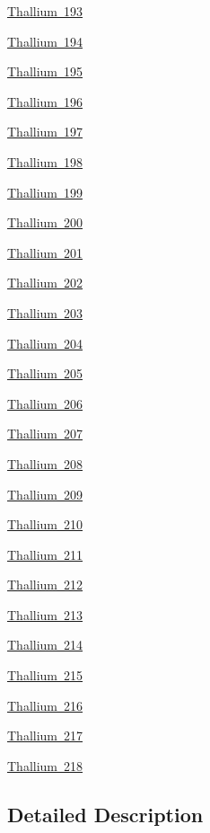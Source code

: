 \begin{DoxyCompactItemize}
\mbox{\hyperlink{group___isotope_const-_thallium-_tl193}{Thallium 193}}
\item 
\mbox{\hyperlink{group___isotope_const-_thallium-_tl194}{Thallium 194}}
\item 
\mbox{\hyperlink{group___isotope_const-_thallium-_tl195}{Thallium 195}}
\item 
\mbox{\hyperlink{group___isotope_const-_thallium-_tl196}{Thallium 196}}
\item 
\mbox{\hyperlink{group___isotope_const-_thallium-_tl197}{Thallium 197}}
\item 
\mbox{\hyperlink{group___isotope_const-_thallium-_tl198}{Thallium 198}}
\item 
\mbox{\hyperlink{group___isotope_const-_thallium-_tl199}{Thallium 199}}
\item 
\mbox{\hyperlink{group___isotope_const-_thallium-_tl200}{Thallium 200}}
\item 
\mbox{\hyperlink{group___isotope_const-_thallium-_tl201}{Thallium 201}}
\item 
\mbox{\hyperlink{group___isotope_const-_thallium-_tl202}{Thallium 202}}
\item 
\mbox{\hyperlink{group___isotope_const-_thallium-_tl203}{Thallium 203}}
\item 
\mbox{\hyperlink{group___isotope_const-_thallium-_tl204}{Thallium 204}}
\item 
\mbox{\hyperlink{group___isotope_const-_thallium-_tl205}{Thallium 205}}
\item 
\mbox{\hyperlink{group___isotope_const-_thallium-_tl206}{Thallium 206}}
\item 
\mbox{\hyperlink{group___isotope_const-_thallium-_tl207}{Thallium 207}}
\item 
\mbox{\hyperlink{group___isotope_const-_thallium-_tl208}{Thallium 208}}
\item 
\mbox{\hyperlink{group___isotope_const-_thallium-_tl209}{Thallium 209}}
\item 
\mbox{\hyperlink{group___isotope_const-_thallium-_tl210}{Thallium 210}}
\item 
\mbox{\hyperlink{group___isotope_const-_thallium-_tl211}{Thallium 211}}
\item 
\mbox{\hyperlink{group___isotope_const-_thallium-_tl212}{Thallium 212}}
\item 
\mbox{\hyperlink{group___isotope_const-_thallium-_tl213}{Thallium 213}}
\item 
\mbox{\hyperlink{group___isotope_const-_thallium-_tl214}{Thallium 214}}
\item 
\mbox{\hyperlink{group___isotope_const-_thallium-_tl215}{Thallium 215}}
\item 
\mbox{\hyperlink{group___isotope_const-_thallium-_tl216}{Thallium 216}}
\item 
\mbox{\hyperlink{group___isotope_const-_thallium-_tl217}{Thallium 217}}
\item 
\mbox{\hyperlink{group___isotope_const-_thallium-_tl218}{Thallium 218}}
\end{DoxyCompactItemize}


\subsection{Detailed Description}
